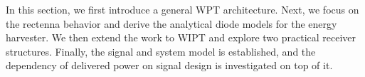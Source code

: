 In this section, we first introduce a general WPT architecture. Next, we focus on the rectenna behavior and derive the analytical diode models for the energy harvester. We then extend the work to WIPT and explore two practical receiver structures. Finally, the signal and system model is established, and the dependency of delivered power on signal design is investigated on top of it. 